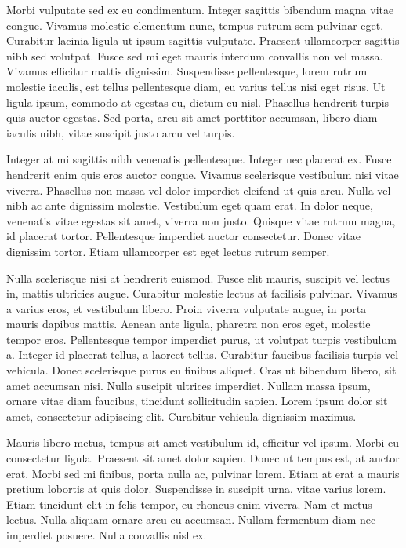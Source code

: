 \documentclass{homework}
\begin{document}
Morbi vulputate sed ex eu condimentum. Integer sagittis bibendum magna vitae congue. Vivamus molestie elementum nunc, tempus rutrum sem pulvinar eget. Curabitur lacinia ligula ut ipsum sagittis vulputate. Praesent ullamcorper sagittis nibh sed volutpat. Fusce sed mi eget mauris interdum convallis non vel massa. Vivamus efficitur mattis dignissim. Suspendisse pellentesque, lorem rutrum molestie iaculis, est tellus pellentesque diam, eu varius tellus nisi eget risus. Ut ligula ipsum, commodo at egestas eu, dictum eu nisl. Phasellus hendrerit turpis quis auctor egestas. Sed porta, arcu sit amet porttitor accumsan, libero diam iaculis nibh, vitae suscipit justo arcu vel turpis.

Integer at mi sagittis nibh venenatis pellentesque. Integer nec placerat ex. Fusce hendrerit enim quis eros auctor congue. Vivamus scelerisque vestibulum nisi vitae viverra. Phasellus non massa vel dolor imperdiet eleifend ut quis arcu. Nulla vel nibh ac ante dignissim molestie. Vestibulum eget quam erat. In dolor neque, venenatis vitae egestas sit amet, viverra non justo. Quisque vitae rutrum magna, id placerat tortor. Pellentesque imperdiet auctor consectetur. Donec vitae dignissim tortor. Etiam ullamcorper est eget lectus rutrum semper.

Nulla scelerisque nisi at hendrerit euismod. Fusce elit mauris, suscipit vel lectus in, mattis ultricies augue. Curabitur molestie lectus at facilisis pulvinar. Vivamus a varius eros, et vestibulum libero. Proin viverra vulputate augue, in porta mauris dapibus mattis. Aenean ante ligula, pharetra non eros eget, molestie tempor eros. Pellentesque tempor imperdiet purus, ut volutpat turpis vestibulum a. Integer id placerat tellus, a laoreet tellus. Curabitur faucibus facilisis turpis vel vehicula. Donec scelerisque purus eu finibus aliquet. Cras ut bibendum libero, sit amet accumsan nisi. Nulla suscipit ultrices imperdiet. Nullam massa ipsum, ornare vitae diam faucibus, tincidunt sollicitudin sapien. Lorem ipsum dolor sit amet, consectetur adipiscing elit. Curabitur vehicula dignissim maximus.

Mauris libero metus, tempus sit amet vestibulum id, efficitur vel ipsum. Morbi eu consectetur ligula. Praesent sit amet dolor sapien. Donec ut tempus est, at auctor erat. Morbi sed mi finibus, porta nulla ac, pulvinar lorem. Etiam at erat a mauris pretium lobortis at quis dolor. Suspendisse in suscipit urna, vitae varius lorem. Etiam tincidunt elit in felis tempor, eu rhoncus enim viverra. Nam et metus lectus. Nulla aliquam ornare arcu eu accumsan. Nullam fermentum diam nec imperdiet posuere. Nulla convallis nisl ex.
\end{document}
